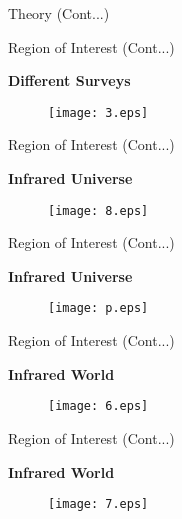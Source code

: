 \documentclass[12pt,a4paper]{beamer}
\begin{document}
\begin{frame}{Theory (Cont...)}
\begin{frame}{Region of Interest (Cont...)}
\begin{block}{\centering\textbf{Different Surveys \vspace*{.5cm}}}
\begin{figure}[h]
\vspace{0.0cm} \centering
\texttt{[image: 3.eps]}
\end{figure}
\end{block}
\end{frame}

\begin{frame}{Region of Interest (Cont...)}
\begin{block}{\centering\textbf{Infrared Universe \vspace*{.5cm}}}
\begin{figure}[h]
\vspace{0.0cm} \centering
\texttt{[image: 8.eps]}
\end{figure}
\end{block}
\end{frame}

\begin{frame}{Region of Interest (Cont...)}
\begin{block}{\centering\textbf{Infrared Universe \vspace*{.5cm}}}
\begin{figure}[h]
\vspace{0.0cm} \centering
\texttt{[image: p.eps]}
\end{figure}
\end{block}
\end{frame}

\begin{frame}{Region of Interest (Cont...)}
\begin{block}{\centering\textbf{Infrared World \vspace*{.5cm}}}
\begin{figure}[h]
\vspace{0.0cm} \centering
\texttt{[image: 6.eps]}
\end{figure}
\end{block}
\end{frame}

\begin{frame}{Region of Interest (Cont...)}
\begin{block}{\centering\textbf{Infrared World \vspace*{.5cm}}}
\begin{figure}[h]
\vspace{0.0cm} \centering
\texttt{[image: 7.eps]}
\end{figure}
\end{block}
\end{frame}



\end{frame}
\end{document}

